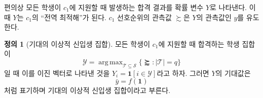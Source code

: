 \documentclass[12pt]{article} %
\DeclareMathOperator*{\argmax}{arg\,max}
\newif\ifEN
\theoremstyle{definition}
\newtheorem{definition}{Definition}
\theoremstyle{definition}
\newtheorem{definition}{정의}
\begin{document}
\ifEN {
It is convenient to define the random variable $Y$ as the admissions vector that arises when \emph{every} student applies to $c_1$; that is, $c_1$’s “global optimum.” A given realization $\succsim$ of $c_1$’s preference order induces a realization $y$ of $Y$.
\begin{definition}[Expected ideal entering class]
Let \begin{equation}\mathcal{Y} =  \argmax_{\mathcal{T}\subseteq \mathcal{S}} \{ \succapprox : |\mathcal{T}| =q\} \end{equation} denote the set of students $c_1$ admits when all students apply, and let $Y_i = \mathbf{1}[ i \in \mathcal{Y}]$ denote the same encoded as a binary vector. Then the expectation of $Y$ is denoted
\begin{equation}\bar y = f(\mathbf{1})\end{equation}
and called the \emph{expected ideal entering class}.
\end{definition}
} \else {
편의상 모든 학생이 $c_1$에 지원할 때 발생하는 합격 결과를 확률 변수 $Y$로 나타낸다. 이때 $Y$는 $c_1$의 “전역 최적해”가 된다. $c_1$ 선호순위의 관측값 $\succsim$은 $Y$의 관측값인 $y$를 유도한다.
\begin{definition}[기대의 이상적 신입생 집합]
모든 학생이 $c_1$에 지원할 때 합격하는 학생 집합이  \begin{equation}\mathcal{Y} =  \argmax_{\mathcal{T}\subseteq \mathcal{S}} \{ \succapprox : |\mathcal{T}| =q\} \end{equation}일 때 이를 이진 벡터로 나타낸 것을 $Y_i = \mathbf{1}[ i \in \mathcal{Y}]$라고 하자. 그러면 $Y$의 기대값은
\begin{equation}\bar y = f(\mathbf{1})\end{equation}
처럼 표기하며 기대의 이상적 신입생 집합이라고 부른다.
\end{definition}
} \fi
\end{document}
